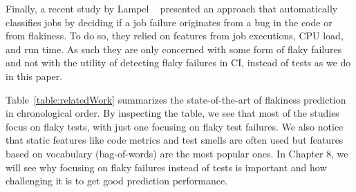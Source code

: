 Finally, a recent study by Lampel \etal~\cite{lampelOrange} presented an approach that automatically classifies jobs by deciding if a job failure originates from a bug in the code or from flakiness. To do so, they relied on features from job executions, \eg CPU load, and run time. As such they are only concerned with some form of flaky failures and not with the utility of detecting flaky failures in CI, instead of tests as we do in this paper. 

Table~\ref{table:relatedWork} summarizes the state-of-the-art of flakiness prediction in chronological order. By inspecting the table, we see that most of the studies focus on flaky tests, with just one focusing on flaky test failures. We also notice that static features like code metrics and test smells are often used but features based on vocabulary (\ie bag-of-words) are the most popular ones. In Chapter 8, we will see why focusing on flaky failures instead of tests is important and how challenging it is to get good prediction performance.

